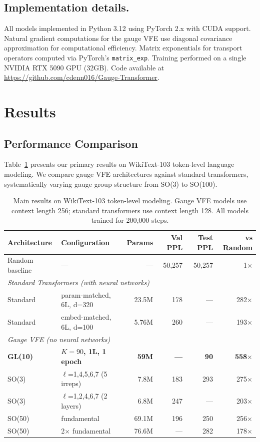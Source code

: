 \documentclass[twoside,11pt]{article}
\begin{document}
\subsection{Implementation details.}

All models implemented in Python 3.12 using PyTorch 2.x with CUDA support. Natural gradient computations for the gauge VFE use diagonal covariance approximation for computational efficiency. Matrix exponentials for transport operators computed via PyTorch's \texttt{matrix\_exp}. Training performed on a single NVIDIA RTX 5090 GPU (32GB). Code available at \url{https://github.com/cdenn016/Gauge-Transformer}.



\section{Results}
\label{sec:results}

\subsection{Performance Comparison}
\label{sec:performance}

Table~\ref{tab:main_results} presents our primary results on WikiText-103 token-level language modeling. We compare gauge VFE architectures against standard transformers, systematically varying gauge group structure from SO(3) to SO(100).

\begin{table}[t]
\centering
\caption{Main results on WikiText-103 token-level modeling. Gauge VFE models use context length 256; standard transformers use context length 128. All models trained for 200,000 steps.}
\label{tab:main_results}
\begin{tabular}{llrrrr}
\toprule
\textbf{Architecture} & \textbf{Configuration} & \textbf{Params} & \textbf{Val PPL} & \textbf{Test PPL} & \textbf{vs Random} \\
\midrule
Random baseline & --- & --- & 50,257 & 50,257 & 1$\times$ \\
\midrule
\multicolumn{6}{l}{\textit{Standard Transformers (with neural networks)}} \\
Standard & param-matched, 6L, d=320 & 23.5M & 178 & --- & 282$\times$ \\
Standard & embed-matched, 6L, d=100 & 5.76M & 260 & --- & 193$\times$ \\
\midrule
\multicolumn{6}{l}{\textit{Gauge VFE (no neural networks)}} \\
\rowcolor{yellow!15}
\textbf{GL(10)} & \textbf{$K{=}90$, 1L, 1 epoch} & \textbf{59M} & \textbf{---} & \textbf{90} & \textbf{558$\times$} \\
SO(3) & $\ell$=1,4,5,6,7 (5 irreps) & 7.8M & 183 & 293 & 275$\times$ \\
SO(3) & $\ell$=1,2,4,6,7 (2 layers) & 6.8M & 247 & --- & 203$\times$ \\
SO(50) & fundamental & 69.1M & 196 & 250 & 256$\times$ \\
SO(50) & 2$\times$ fundamental & 76.6M & --- & 282 & 178$\times$ \\
\bottomrule
\end{tabular}
\end{table}
\end{document}
